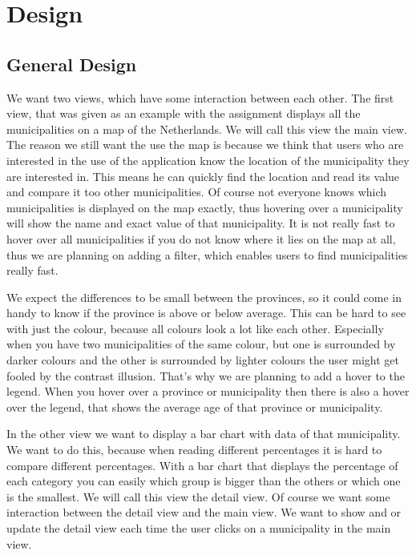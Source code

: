 \section{Design}\label{Sec:Des}
	\subsection{General Design}
		We want two views, which have some interaction between each other.
		The first view, that was given as an example with the assignment displays all the municipalities on a map of the Netherlands.
		We will call this view the main view.
		The reason we still want the use the map is because we think that users who are interested in the use of the application know the location of the municipality they are interested in.
		This means he can quickly find the location and read its value and compare it too other municipalities.
		Of course not everyone knows which municipalities is displayed on the map exactly, thus hovering over a municipality will show the name and exact value of that municipality.
		It is not really fast to hover over all municipalities if you do not know where it lies on the map at all, thus we are planning on adding a filter, which enables users to find municipalities really fast.

		We expect the differences to be small between the provinces, so it could come in handy to know if the province is above or below average.
		This can be hard to see with just the colour, because all colours look a lot like each other.
		Especially when you have two municipalities of the same colour, but one is surrounded by darker colours and the other is surrounded by lighter colours the user might get fooled by the contrast illusion.
		That's why we are planning to add a hover to the legend.
		When you hover over a province or municipality then there is also a hover over the legend, that shows the average age of that province or municipality.

		In the other view we want to display a bar chart with data of that municipality.
		We want to do this, because when reading different percentages it is hard to compare different percentages.
		With a bar chart that displays the percentage of each category you can easily which group is bigger than the others or which one is the smallest.
		We will call this view the detail view.
		Of course we want some interaction between the detail view and the main view.
		We want to show and or update the detail view each time the user clicks on a municipality in the main view.

